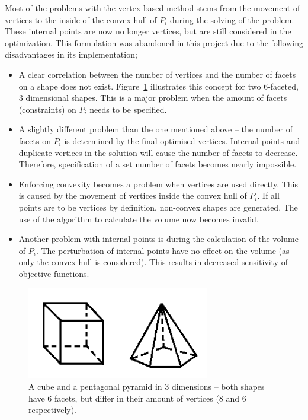 Most of the problems with the vertex based method stems from the movement of vertices to the inside of the convex hull of $P_i$ during the solving of the problem.
These internal points are now no longer vertices, but are still considered in the optimization.
This formulation was abandoned in this project due to the following disadvantages in its implementation;
\begin{itemize}
  \item A clear correlation between the number of vertices and the number of facets on a shape does not exist.
Figure~\ref{fig:vertsvsfaces} illustrates this concept for two 6-faceted, 3 dimensional shapes.
This is a major problem when the amount of facets (constraints) on $P_i$ needs to be specified.
  \item A slightly different problem than the one mentioned above -- the number of facets on $P_i$ is determined by the final optimised vertices.
Internal points and duplicate vertices in the solution will cause the number of facets to decrease.
Therefore, specification of a set number of facets becomes nearly impossible.
  \item Enforcing convexity becomes a problem when vertices are used directly.
This is caused by the movement of vertices inside the convex hull of $P_i$.
If all points are to be vertices by definition, non-convex shapes are generated.
The use of the \qhull algorithm to calculate the volume now becomes invalid. 
  \item Another problem with internal points is during the calculation of the volume of $P_i$.
The perturbation of internal points have no effect on the volume (as only the convex hull is considered).
This results in decreased sensitivity of objective functions.
\end{itemize}

\begin{figure}[htbp]
  \centering
  \includegraphics[width=8cm]{graph/vertsvsfaces}
  \caption[The unclear correlation between number of facets and vertices]{A cube and a pentagonal pyramid in 3 dimensions -- both shapes have 6 facets, but differ in their amount of vertices (8 and 6  respectively).}
  \label{fig:vertsvsfaces}
\end{figure}

